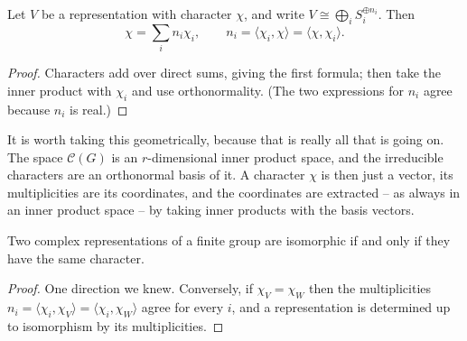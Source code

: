 \documentclass[a4paper]{scrartcl}
\newcommand{\ip}[2]{\langle #1, #2 \rangle}
\begin{document}
\begin{corollary}[Decomposition]
	Let $V$ be a representation with character $\chi$, and write $V \cong \bigoplus_i S_i^{\oplus n_i}$. Then
	$$\chi = \sum_i n_i \chi_i, \qquad n_i = \ip{\chi_i}{\chi} = \ip{\chi}{\chi_i}.$$
\end{corollary}
\begin{proof}
	Characters add over direct sums, giving the first formula; then take the inner product with $\chi_i$ and use orthonormality. (The two expressions for $n_i$ agree because $n_i$ is real.)
\end{proof}

It is worth taking this geometrically, because that is really all that is going on. The space $\mathcal C(G)$ is an $r$-dimensional inner product space, and the irreducible characters are an orthonormal basis of it. A character $\chi$ is then just a vector, its multiplicities are its coordinates, and the coordinates are extracted -- as always in an inner product space -- by taking inner products with the basis vectors.

\begin{center}
\end{center}
\vspace{0.3em}

\begin{corollary}
	Two complex representations of a finite group are isomorphic if and only if they have the same character.
\end{corollary}
\begin{proof}
	One direction we knew. Conversely, if $\chi_V = \chi_W$ then the multiplicities $n_i = \ip{\chi_i}{\chi_V} = \ip{\chi_i}{\chi_W}$ agree for every $i$, and a representation is determined up to isomorphism by its multiplicities.
\end{proof}
\end{document}
